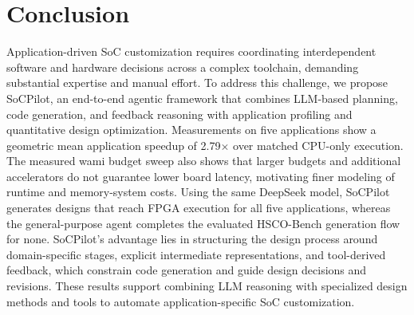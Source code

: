 \section{Conclusion}
Application-driven SoC customization requires coordinating interdependent software and hardware decisions across a complex toolchain, demanding substantial expertise and manual effort. To address this challenge, we propose SoCPilot, an end-to-end agentic framework that combines LLM-based planning, code generation, and feedback reasoning with application profiling and quantitative design optimization. Measurements on five applications show a geometric mean application speedup of 2.79$\times$ over matched CPU-only execution. The measured wami budget sweep also shows that larger budgets and additional accelerators do not guarantee lower board latency, motivating finer modeling of runtime and memory-system costs. Using the same DeepSeek model, SoCPilot generates designs that reach FPGA execution for all five applications, whereas the general-purpose agent completes the evaluated HSCO-Bench generation flow for none. SoCPilot's advantage lies in structuring the design process around domain-specific stages, explicit intermediate representations, and tool-derived feedback, which constrain code generation and guide design decisions and revisions. These results support combining LLM reasoning with specialized design methods and tools to automate application-specific SoC customization.
